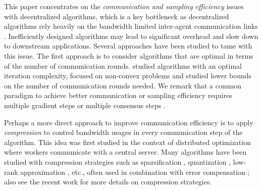 \documentclass[10pt]{article} %
\newcommand{\revision}{}
\theoremstyle{plain}
\theoremstyle{definition}
\theoremstyle{remark}
\begin{document}
This paper concentrates on the \emph{communication and sampling efficiency} issues with decentralized algorithms, which is a key bottleneck as decentralized algorithms rely heavily on the bandwidth limited inter-agent communication links \citep{wang2021field}. Inefficiently designed algorithms may lead to significant overhead and slow down to downstream applications. Several approaches have been studied to tame with this issue. The first approach is to consider algorithms that are optimal in terms of the number of communication rounds. \citet{scaman2019optimal,gorbunov2019optimal, uribe2021dual} studied algorithms with an optimal iteration complexity, \citet{sun2019distributed, sun2020improving, pmlr-v139-lu21a} focused on non-convex problems and studied lower bounds on the number of communication rounds needed. We remark that a common paradigm to achieve better communication or sampling efficiency requires multiple gradient steps \citep{nadiradze2021asynchronous} or multiple consensus steps \citep{pmlr-v139-lu21a}.

Perhaps a more direct approach to improve communication efficiency is to apply \emph{compression} to control bandwidth usages in every communication step of the algorithm. This idea was first studied in the context of {distributed optimization} where workers communicate with a central server. Many algorithms have been studied with compression strategies such as sparsification \citep{stich2018sparsified, alistarh2019convergence, wangni2018gradient}, quantization \citep{wen2017terngrad,alistarh2017qsgd, bernstein2018signsgd, reisizadeh2020fedpaq}, low-rank approximation \citep{vogels2019powersgd}, etc., often used in combination with error compensation \citep{mishchenko2019distributed, tang2019doublesqueeze}{; \revision also see} the recent work \citep{richtarik2021ef21} {\revision for more details on compression strategies}.
\end{document}
